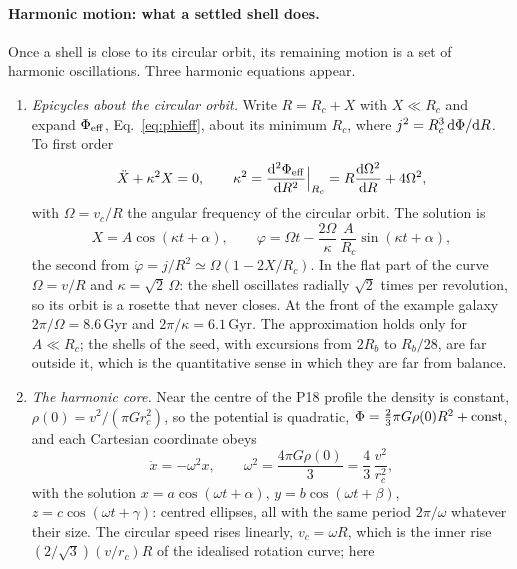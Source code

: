 \documentclass[11pt,a4paper]{article}
\begin{document}
\paragraph{Harmonic motion: what a settled shell does.} Once a shell is close to its
circular orbit, its remaining motion is a set of harmonic oscillations. Three
harmonic equations appear.
\begin{enumerate}
\item \emph{Epicycles about the circular orbit.} Write $R=R_c+X$ with $X\ll R_c$ and
  expand $\Phi_{\rm eff}$, Eq.~\eqref{eq:phieff}, about its minimum $R_c$, where
  $j^2=R_c^3\,{\rm d}\Phi/{\rm d}R$. To first order
  \begin{equation}
    \ddot X+\kappa^2X=0,\qquad
    \kappa^2=\frac{{\rm d}^2\Phi_{\rm eff}}{{\rm d}R^2}\Big|_{R_c}
    =R\frac{{\rm d}\Omega^2}{{\rm d}R}+4\Omega^2,
  \end{equation}
  with $\Omega=v_c/R$ the angular frequency of the circular orbit. The solution is
  \begin{equation}
    X=A\cos(\kappa t+\alpha),\qquad
    \varphi=\Omega t-\frac{2\Omega}{\kappa}\,\frac{A}{R_c}\sin(\kappa t+\alpha),
  \end{equation}
  the second from $\dot\varphi=j/R^2\simeq\Omega(1-2X/R_c)$. In the flat part of the
  curve $\Omega=v/R$ and $\kappa=\sqrt2\,\Omega$: the shell oscillates radially
  $\sqrt2$ times per revolution, so its orbit is a rosette that never closes. At the
  front of the example galaxy $2\pi/\Omega=8.6$\,Gyr and $2\pi/\kappa=6.1$\,Gyr. The
  approximation holds only for $A\ll R_c$; the shells of the seed, with excursions
  from $2R_b$ to $R_b/28$, are far outside it, which is the quantitative sense in
  which they are far from balance.
\item \emph{The harmonic core.} Near the centre of the P18 profile the density is
  constant, $\rho(0)=v^2/(\pi Gr_c^2)$, so the potential is quadratic,
  $\Phi=\tfrac23\pi G\rho(0)R^2+{\rm const}$, and each Cartesian coordinate obeys
  \begin{equation}
    \ddot x=-\omega^2x,\qquad
    \omega^2=\frac{4\pi G\rho(0)}{3}=\frac43\,\frac{v^2}{r_c^2},
  \end{equation}
  with the solution $x=a\cos(\omega t+\alpha)$, $y=b\cos(\omega t+\beta)$,
  $z=c\cos(\omega t+\gamma)$: centred ellipses, all with the same period $2\pi/\omega$
  whatever their size. The circular speed rises linearly, $v_c=\omega R$, which is
  the inner rise $(2/\sqrt3)(v/r_c)R$ of the idealised rotation curve; here

\end{enumerate}
\end{document}
